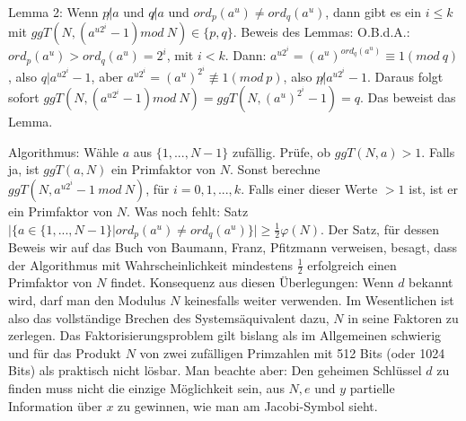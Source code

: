 \documentclass[a4paper]{article}
\begin{document}
\begin{multicols}{3}
        Lemma 2: Wenn $p\not| a$ und $q\not| a$ und $ord_p(a^u)\not= ord_q(a^u)$, dann gibt es ein $i\leq k$ mit $ggT(N,(a^{u2^i}-1) mod\ N)\in\{p,q\}$.
        Beweis des Lemmas: O.B.d.A.: $ord_p(a^u)>ord_q(a^u) = 2^i$, mit $i<k$. Dann: $a^{u2^i} = (a^u)^{ord_q(a^u)} \equiv 1 (mod\ q)$, also $q|a^{u2^i}- 1$, aber $a^{u2^i}= (a^u)^{2^i} \not\equiv 1 (mod\ p)$, also $p\not| a^{u2^i}- 1$.
        Daraus folgt sofort $ggT(N,(a^{u 2^i}-1) mod\ N) = ggT(N,(a^u)^{2^i}-1) =q$. Das beweist das Lemma.

        Algorithmus: Wähle $a$ aus $\{1,... ,N-1\}$ zufällig. Prüfe, ob $ggT(N, a)>1$. Falls ja, ist $ggT(a, N)$ ein Primfaktor von $N$. Sonst berechne $ggT(N, a^{u 2^i}-1\ mod\ N)$, für $i=0,1,... , k$. Falls einer dieser Werte $>1$ ist, ist er ein Primfaktor von $N$. Was noch fehlt: Satz $|\{a\in\{1,...,N-1\}|ord_p(a^u)\not= ord_q(a^u)\}|\geq\frac{1}{2}\varphi(N)$. Der Satz, für dessen Beweis wir auf das Buch von Baumann, Franz, Pfitzmann verweisen, besagt, dass der Algorithmus mit Wahrscheinlichkeit mindestens $\frac{1}{2}$ erfolgreich einen Primfaktor von $N$ findet.
        Konsequenz aus diesen Überlegungen: Wenn $d$ bekannt wird, darf man den Modulus $N$ keinesfalls weiter verwenden.
        Im Wesentlichen ist also das vollständige Brechen des Systemsäquivalent dazu, $N$ in seine Faktoren zu zerlegen. Das Faktorisierungsproblem gilt bislang als im Allgemeinen schwierig und für das Produkt $N$ von zwei zufälligen Primzahlen mit 512 Bits (oder 1024 Bits) als praktisch nicht lösbar.
        Man beachte aber: Den geheimen Schlüssel $d$ zu finden muss nicht die einzige Möglichkeit sein, aus $N,e$ und $y$ partielle Information über $x$ zu gewinnen, wie man am Jacobi-Symbol sieht.


\end{multicols}
\end{document}
